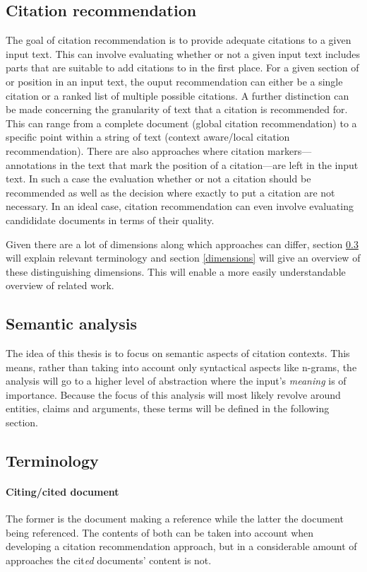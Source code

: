 \documentclass{proseminar}
\begin{document}
\subsection{Citation recommendation}
The goal of citation recommendation is to provide adequate citations to a given input text. This can involve evaluating whether or not a given input text includes parts that are suitable to add citations to in the first place. For a given section of or position in an input text, the ouput recommendation can either be a single citation or a ranked list of multiple possible citations. A further distinction can be made concerning the granularity of text that a citation is recommended for. This can range from a complete document (global citation recommendation) to a specific point within a string of text (context aware/local citation recommendation). There are also approaches where citation markers---annotations in the text that mark the position of a citation---are left in the input text. In such a case the evaluation whether or not a citation should be recommended as well as the decision where exactly to put a citation are not necessary. In an ideal case, citation recommendation can even involve evaluating candididate documents in terms of their quality.

Given there are a lot of dimensions along which approaches can differ, section \ref{terminology} will explain relevant terminology and section \ref{dimensions} will give an overview of these distinguishing dimensions. This will enable a more easily understandable overview of related work.

\subsection{Semantic analysis}
The idea of this thesis is to focus on semantic aspects of citation contexts. This means, rather than taking into account only syntactical aspects like n-grams, the analysis will go to a higher level of abstraction where the input's \emph{meaning} is of importance. Because the focus of this analysis will most likely revolve around entities, claims and arguments, these terms will be defined in the following section.

\subsection{Terminology}\label{terminology}
\paragraph{Citing/cited document}
The former is the document making a reference while the latter the document being referenced. The contents of both can be taken into account when developing a citation recommendation approach, but in a considerable amount of approaches the cit\emph{ed} documents' content is not.
\end{document}
